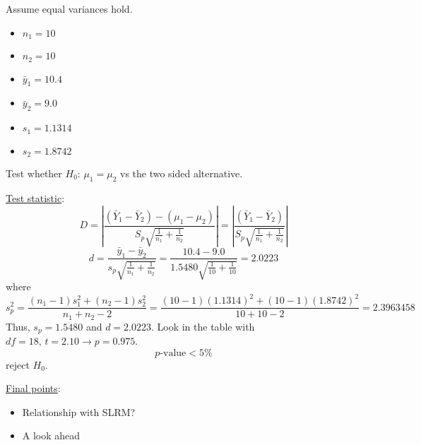 \begin{exbox}
    \begin{example} Assume equal variances hold.
        \begin{itemize}
            \item $ n_1=10 $
            \item $ n_2=10 $
            \item $ \bar{y}_1=10.4 $
            \item $ \bar{y}_2=9.0 $
            \item $ s_1=1.1314 $
            \item $ s_2=1.8742 $
        \end{itemize}
        Test whether $ H_0 $: $ \mu_1=\mu_2 $ vs the two sided alternative.

        \underline{Test statistic}:
        \[ D=\left|\frac{(\bar{Y}_1-\bar{Y}_2)-(\mu_1-\mu_2)}{S_p\sqrt{\frac{1}{n_1}+\frac{1}{n_2}}}\right|=
            \left|\frac{(\bar{Y}_1-\bar{Y}_2)}{S_p\sqrt{\frac{1}{n_1}+\frac{1}{n_2}}}\right| \]
        \[ d=\frac{\bar{y}_1-\bar{y}_2}{s_p\sqrt{\frac{1}{n_1}+\frac{1}{n_2}}}=
            \frac{10.4-9.0}{1.5480\sqrt{\frac{1}{10}+\frac{1}{10}}}=2.0223  \]
        where
        \[ s_p^2=\frac{(n_1-1)s_1^2+(n_2-1)s_2^2}{n_1+n_2-2}=\frac{(10-1)(1.1314)^2+(10-1)(1.8742)^2}{10+10-2}=2.3963458  \]
        Thus, $ s_p=1.5480 $ and $ d=2.0223 $. Look in the table with $ df=18,\,t=2.10 \rightarrow
            p=0.975$.
        \[ p\text{-value}<5\% \]
        reject $ H_0 $.
    \end{example}
\end{exbox}

\underline{Final points}:
\begin{itemize}
    \item Relationship with SLRM?
    \item A look ahead
\end{itemize}
